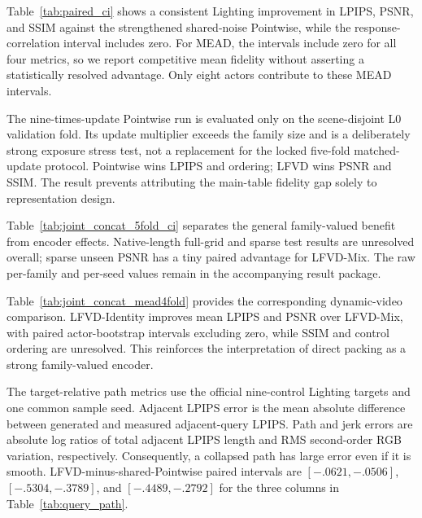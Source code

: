 

Table~\ref{tab:paired_ci} shows a consistent Lighting improvement in LPIPS,
PSNR, and SSIM against the strengthened shared-noise Pointwise, while the
response-correlation interval includes zero. For MEAD, the intervals include
zero for all four metrics, so we report competitive mean fidelity without
asserting a statistically resolved advantage. Only eight actors contribute to
these MEAD intervals.



The nine-times-update Pointwise run is evaluated only on the scene-disjoint L0
validation fold. Its update multiplier exceeds the family size and is a
deliberately strong exposure stress test, not a replacement for the locked
five-fold matched-update protocol. Pointwise wins LPIPS and ordering; LFVD
wins PSNR and SSIM. The result prevents attributing the main-table fidelity
gap solely to representation design.



Table~\ref{tab:joint_concat_5fold_ci} separates the general family-valued
benefit from encoder effects. Native-length full-grid and sparse test results
are unresolved overall; sparse unseen PSNR has a tiny paired advantage for
LFVD-Mix. The raw per-family and per-seed values remain in the accompanying
result package.



Table~\ref{tab:joint_concat_mead4fold} provides the corresponding dynamic-video
comparison. LFVD-Identity improves mean LPIPS and PSNR over LFVD-Mix, with paired
actor-bootstrap intervals excluding zero, while SSIM and control ordering are
unresolved. This reinforces the interpretation of direct packing as a strong
family-valued encoder.



The target-relative path metrics use the official nine-control Lighting
targets and one common sample seed. Adjacent LPIPS error is the mean absolute
difference between generated and measured adjacent-query LPIPS. Path and jerk
errors are absolute log ratios of total adjacent LPIPS length and RMS
second-order RGB variation, respectively. Consequently, a collapsed path has
large error even if it is smooth. LFVD-minus-shared-Pointwise paired intervals
are $[-.0621,-.0506]$, $[-.5304,-.3789]$, and $[-.4489,-.2792]$ for the three
columns in Table~\ref{tab:query_path}.


